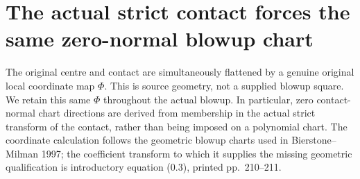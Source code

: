 \section{The actual strict contact forces the same zero-normal blowup chart}

The original centre and contact are simultaneously flattened by a genuine original local coordinate map $\Phi$. This is source geometry, not a supplied blowup square. We retain this same $\Phi$ throughout the actual blowup. In particular, zero contact-normal chart directions are derived from membership in the actual strict transform of the contact, rather than being imposed on a polynomial chart. The coordinate calculation follows the geometric blowup charts used in Bierstone--Milman 1997; the coefficient transform to which it supplies the missing geometric qualification is introductory equation (0.3), printed pp.~210--211.

